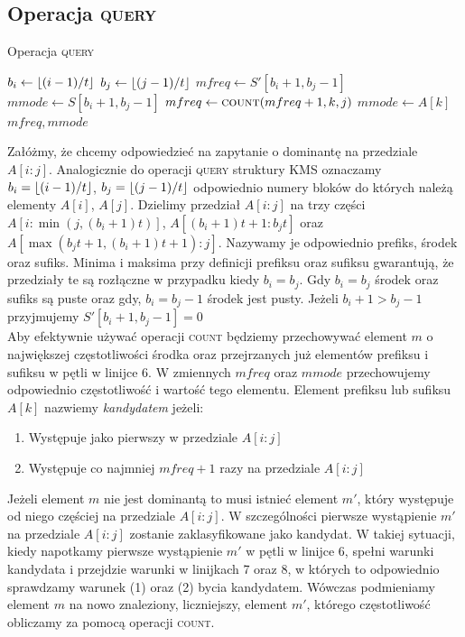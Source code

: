 \subsection{Operacja \textsc{query}}
\begin{algorithm}[t]
    \caption{Operacja \textsc{query}}
    \label{alg:cdlmw-query}
    \begin{algorithmic}[1]
            \State $b_i \gets \left\lfloor(i-1)/t\right\rfloor$
            \State $b_j \gets \left\lfloor(j-1)/t\right\rfloor$
            \State $mfreq \gets S'[b_i+1,b_j-1]$
            \State $mmode \gets S[b_i+1,b_j-1]$
                            \State $mfreq \gets \textsc{count}(mfreq+1, k, j)$
                            \State $mmode \gets A[k]$
                        \EndIf
                    \EndIf
                \EndFor
            \State \Return $mfreq, mmode$
        \EndFunction
    \end{algorithmic}
\end{algorithm}
Załóżmy, że chcemy odpowiedzieć na zapytanie o dominantę na przedziale $A[i:j]$. Analogicznie do operacji \textsc{query} struktury KMS oznaczamy $b_i=\left\lfloor(i-1)/t\right\rfloor$, $b_j=\left\lfloor(j-1)/t\right\rfloor$ odpowiednio numery bloków do których należą elementy $A[i]$, $A[j]$. Dzielimy przedział $A[i:j]$ na trzy części $A[i:\min(j, (b_i+1)t)]$, $A[(b_i+1)t+1:b_jt]$ oraz $A[\max(b_jt+1, (b_i+1)t+1):j]$. Nazywamy je odpowiednio prefiks, środek oraz sufiks. Minima i maksima przy definicji prefiksu oraz sufiksu gwarantują, że przedziały te są rozłączne w przypadku kiedy $b_i = b_j$. Gdy $b_i = b_j$ środek oraz sufiks są puste oraz gdy, $b_i=b_j-1$ środek jest pusty. Jeżeli $b_i+1 > b_j-1$ przyjmujemy $S'[b_i+1,b_j-1]=0$\\
Aby efektywnie używać operacji \textsc{count} będziemy przechowywać element $m$ o największej częstotliwości środka oraz przejrzanych już elementów prefiksu i sufiksu w pętli w linijce 6. W zmiennych $mfreq$ oraz $mmode$ przechowujemy odpowiednio częstotliwość i wartość tego elementu. Element prefiksu lub sufiksu $A[k]$ nazwiemy \emph{kandydatem} jeżeli:
\begin{enumerate}[nosep]
    \item Występuje jako pierwszy w przedziale $A[i:j]$
    \item Występuje co najmniej $mfreq+1$ razy na przedziale $A[i:j]$
\end{enumerate}
Jeżeli element $m$ nie jest dominantą to musi istnieć element $m'$, który występuje od niego częściej na przedziale $A[i:j]$. W szczególności pierwsze wystąpienie $m'$ na przedziale $A[i:j]$ zostanie zaklasyfikowane jako kandydat. W takiej sytuacji, kiedy napotkamy pierwsze wystąpienie $m'$ w pętli w linijce 6, spełni warunki kandydata i przejdzie warunki w linijkach 7 oraz 8, w których to odpowiednio sprawdzamy warunek (1) oraz (2) bycia kandydatem. Wówczas podmieniamy element $m$ na nowo znaleziony, liczniejszy, element $m'$, którego częstotliwość obliczamy za pomocą operacji \textsc{count}.
